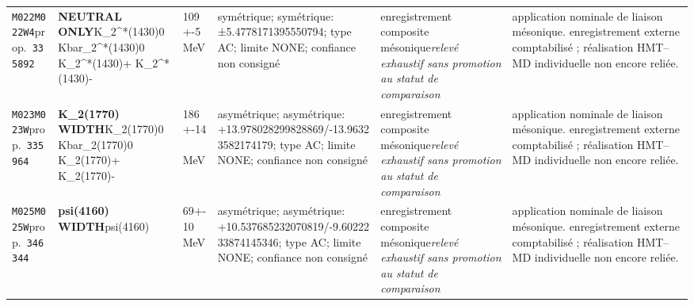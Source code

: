 \begin{landscape}
\begin{longtable}{L{1.85cm}L{4.45cm}L{2.35cm}L{4.05cm}L{3.35cm}L{7.15cm}}
\texttt{M022}\newline \texttt{M022W4}\newline prop.\ \texttt{335892} & \textbf{NEUTRAL ONLY}\newline K\_\allowbreak{}2\textasciicircum{}*(1430)0 \textbar{}\allowbreak{} Kbar\_\allowbreak{}2\textasciicircum{}*(1430)0 \textbar{}\allowbreak{} K\_\allowbreak{}2\textasciicircum{}*(1430)+ \textbar{}\allowbreak{} K\_\allowbreak{}2\textasciicircum{}*(1430)- & 109+-5\,MeV & symétrique; symétrique: ±5.4778171395550794; type AC; limite NONE; confiance non consigné & enregistrement composite mésonique\newline \emph{relevé exhaustif sans promotion au statut de comparaison} & application nominale de liaison mésonique. enregistrement externe comptabilisé ; réalisation HMT--MD individuelle non encore reliée. \\
\texttt{M023}\newline \texttt{M023W}\newline prop.\ \texttt{335964} & \textbf{K\_\allowbreak{}2(1770) WIDTH}\newline K\_\allowbreak{}2(1770)0 \textbar{}\allowbreak{} Kbar\_\allowbreak{}2(1770)0 \textbar{}\allowbreak{} K\_\allowbreak{}2(1770)+ \textbar{}\allowbreak{} K\_\allowbreak{}2(1770)- & 186+-14\,MeV & asymétrique; asymétrique: +13.978028299828869/-13.96323582174179; type AC; limite NONE; confiance non consigné & enregistrement composite mésonique\newline \emph{relevé exhaustif sans promotion au statut de comparaison} & application nominale de liaison mésonique. enregistrement externe comptabilisé ; réalisation HMT--MD individuelle non encore reliée. \\
\texttt{M025}\newline \texttt{M025W}\newline prop.\ \texttt{346344} & \textbf{psi(4160) WIDTH}\newline psi(4160) & 69+-10\,MeV & asymétrique; asymétrique: +10.537685232070819/-9.6022233874145346; type AC; limite NONE; confiance non consigné & enregistrement composite mésonique\newline \emph{relevé exhaustif sans promotion au statut de comparaison} & application nominale de liaison mésonique. enregistrement externe comptabilisé ; réalisation HMT--MD individuelle non encore reliée. \\

\end{longtable}
\end{landscape}
